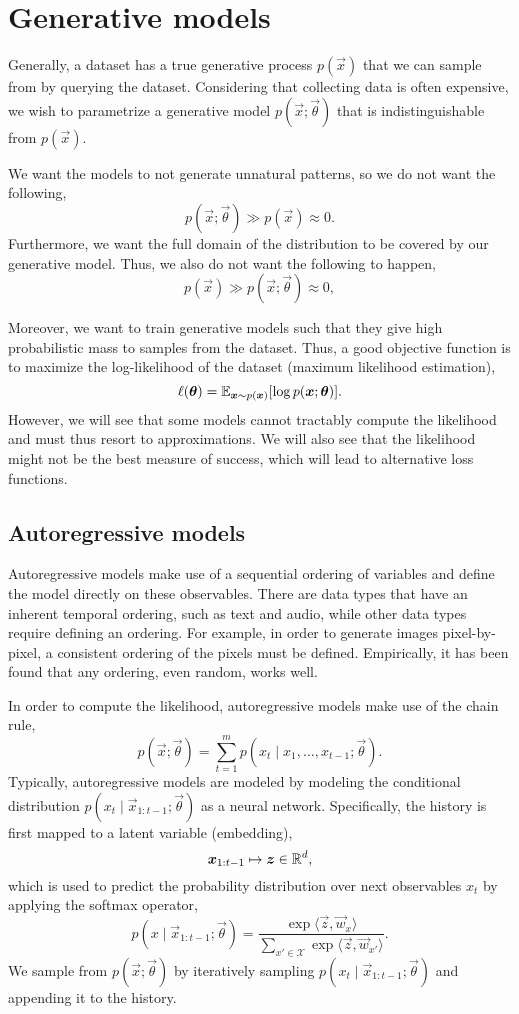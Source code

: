 \section{Generative models}

Generally, a dataset has a true generative process $p(\vec{x})$ that we can sample from by querying
the dataset. Considering that collecting data is often expensive, we wish to parametrize a
generative model $p(\vec{x}; \vec{\theta})$ that is indistinguishable from $p(\vec{x})$.

We want the models to not generate unnatural patterns, so we do not want the following, \[
    p(\vec{x}; \vec{\theta}) \gg p(\vec{x}) \approx 0.
\]
Furthermore, we want the full domain of the distribution to be covered by our generative model.
Thus, we also do not want the following to happen, \[
    p(\vec{x}) \gg p(\vec{x}; \vec{\theta}) \approx 0,
\]

Moreover, we want to train generative models such that they give high probabilistic mass to samples
from the dataset. Thus, a good objective function is to maximize the log-likelihood of the dataset
(maximum likelihood estimation), \[
    \ell(\bm{\theta}) = \mathbb{E}_{\bm{x} \sim p(\bm{x})}[\log p(\bm{x}; \bm{\theta})].
\]
However, we will see that some models cannot tractably compute the likelihood and must thus resort
to approximations. We will also see that the likelihood might not be the best measure of success,
which will lead to alternative loss functions.

\subsection{Autoregressive models}

Autoregressive models make use of a sequential ordering of variables and define the model directly
on these observables. There are data types that have an inherent temporal ordering, such as text
and audio, while other data types require defining an ordering. For example, in order to generate
images pixel-by-pixel, a consistent ordering of the pixels must be defined. Empirically, it has
been found that any ordering, even random, works well.

In order to compute the likelihood, autoregressive models make use of the chain rule, \[
    p(\vec{x}; \vec{\theta}) = \sum_{t=1}^{m} p(x_t \mid x_1, \ldots, x_{t-1}; \vec{\theta}).
\]
Typically, autoregressive models are modeled by modeling the conditional distribution $p(x_t \mid
    \vec{x}_{1:t-1}; \vec{\theta})$ as a neural network. Specifically, the history is first mapped to a
latent variable (embedding), \[
    \bm{x}_{1:t-1} \mapsto \bm{z} \in \mathbb{R}^d,
\]
which is used to predict the probability distribution over next observables $x_t$ by applying the
softmax operator, \[
    p(x \mid \vec{x}_{1:t-1}; \vec{\theta}) = \frac{\exp \langle \vec{z}, \vec{w}_x \rangle}{\sum_{x' \in \mathcal{X}} \exp \langle \vec{z}, \vec{w}_{x'} \rangle}.
\]
We sample from $p(\vec{x}; \vec{\theta})$ by iteratively sampling $p(x_t \mid \vec{x}_{1:t-1};
    \vec{\theta})$ and appending it to the history.

